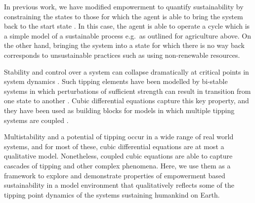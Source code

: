 \documentclass[conference]{IEEEtran}
\begin{document}




In previous work, we have modified empowerment to quantify
sustainability by constraining the states to those for which the agent
is able to bring the system back to the start state
\cite{Kim2009_sustainability}. In this case, the agent is able to
operate a cycle which is a simple model of a sustainable process e.g.\
as outlined for agriculture above. On the other hand, bringing the
system into a state for which there is no way back corresponds to
unsustainable practices such as using non-renewable resources.

Stability and control over a system can collapse dramatically at
critical points in system dynamics
\cite{Lenton2019_riskytippingpoints}. Such tipping elements have been
modelled by bi-stable systems in which perturbations of sufficient
strength can result in transition from one state to another
\cite{Lenton2008_tippingelements}. Cubic differential equations
capture this key property, and they have been used as building blocks
for models in which multiple tipping systems are coupled
\cite{Brummitt2015_coupledcatastrophes,Klose2019_interactingtippingelements}.

Multistability and a potential of tipping occur in a wide range of
real world systems, and for most of these, cubic differential
equations are at most a qualitative model. Nonetheless, coupled cubic
equations are able to capture cascades of tipping and other complex
phenomena. Here, we use them as a framework to explore and demonstrate
properties of empowerment based sustainability in a model environment
that qualitatively reflects some of the tipping point dynamics of the
systems sustaining humankind on Earth.


\end{document}
